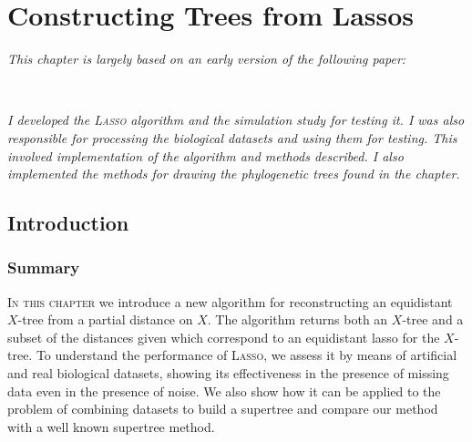 \chapter{Constructing Trees from Lassos}
\label{cha:lasso-construction}

\textit{\sffamily This chapter is largely based on an early version of the
  following paper:}

\vspace{0.5em}

\noindent
\noindent
{}\\


\vspace{1em}

\textit{\sffamily I developed the \textsc{Lasso} algorithm and the simulation
  study for testing it.  I was also responsible for processing the biological
  datasets and using them for testing.  This involved implementation of the
  algorithm and methods described.  I also implemented the methods for drawing
  the phylogenetic trees found in the chapter.}

\newpage

\section{Introduction}
\label{sec:introduction}

\subsection{Summary}

\textsc{In this chapter} we introduce a new algorithm for reconstructing an
equidistant $X$-tree from a partial distance on $X$.  The algorithm returns
both an $X$-tree and a subset of the distances given which correspond to an
equidistant lasso for the $X$-tree.  To understand the performance of
\textsc{Lasso}, we assess it by means of artificial and real biological
datasets, showing its effectiveness in the presence of missing data even in
the presence of noise.  We also show how it can be applied to the problem of
combining datasets to build a supertree and compare our method with a well
known supertree method.

